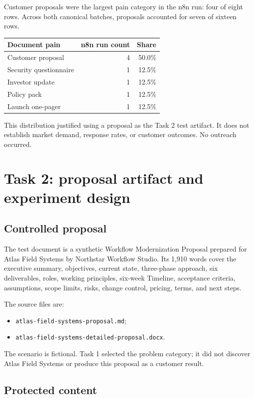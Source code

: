 \documentclass[11pt,a4paper]{article}
\newcommand{\pathcode}[1]{\texttt{#1}}
\begin{document}
Customer proposals were the largest pain category in the n8n run: four of eight rows. Across both canonical batches, proposals accounted for seven of sixteen rows.

\begin{tabularx}{\textwidth}{X r r}
\toprule
Document pain & n8n run count & Share \\
\midrule
Customer proposal & 4 & 50.0\% \\
Security questionnaire & 1 & 12.5\% \\
Investor update & 1 & 12.5\% \\
Policy pack & 1 & 12.5\% \\
Launch one-pager & 1 & 12.5\% \\
\bottomrule
\end{tabularx}

This distribution justified using a proposal as the Task 2 test artifact. It does not establish market demand, response rates, or customer outcomes. No outreach occurred.

\section{Task 2: proposal artifact and experiment design}

\subsection{Controlled proposal}

The test document is a synthetic Workflow Modernization Proposal prepared for Atlas Field Systems by Northstar Workflow Studio. Its 1,910 words cover the executive summary, objectives, current state, three-phase approach, six deliverables, roles, working principles, six-week Timeline, acceptance criteria, assumptions, scope limits, risks, change control, pricing, terms, and next steps.

The source files are:

\begin{itemize}
  \item \pathcode{atlas-field-systems-proposal.md};
  \item \pathcode{atlas-field-systems-detailed-proposal.docx}.
\end{itemize}

The scenario is fictional. Task 1 selected the problem category; it did not discover Atlas Field Systems or produce this proposal as a customer result.

\subsection{Protected content}
\end{document}
